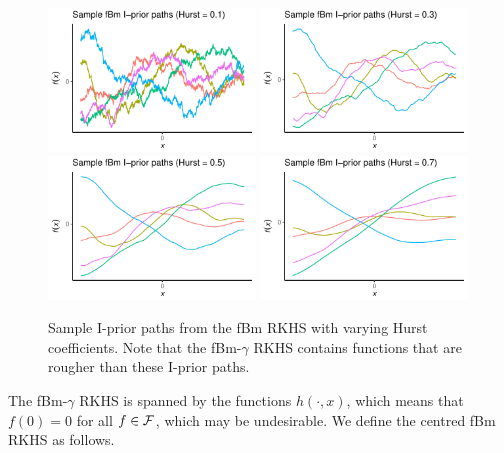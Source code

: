 \begin{figure}[hbt]
  \centering
  \includegraphics[width=0.49\textwidth]{figure/02-kernel_path_fbm_1}
  \includegraphics[width=0.49\textwidth]{figure/02-kernel_path_fbm_3}
  \includegraphics[width=0.49\textwidth]{figure/02-kernel_path_fbm_5}
  \includegraphics[width=0.49\textwidth]{figure/02-kernel_path_fbm_7}
  \caption[Sample I-prior paths from the fBm RKHS with varying Hurst coefficients.]{Sample I-prior paths from the fBm RKHS with varying Hurst coefficients. Note that the fBm-$\gamma$ RKHS contains functions that are rougher than these I-prior paths.}
\end{figure}

\vspace{-0.5em}
The fBm-$\gamma$ RKHS is spanned by the functions $h(\cdot,x)$, which means that $f(0)=0$ for all $f \in {\mathcal F}$, which may be undesirable.
We define the centred fBm RKHS as follows.

